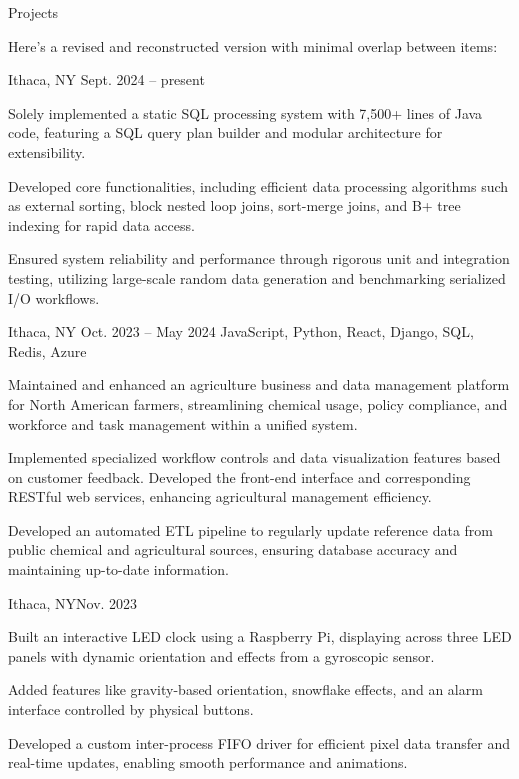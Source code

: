 \documentclass[10pt]{article}
\begin{document}
\begin{customsection}{Projects}

    Here’s a revised and reconstructed version with minimal overlap between items:

    {Ithaca, NY}
    {Sept. 2024 -- present} 
    {} 
    { 
        \item Solely implemented a static SQL processing system with 7,500+ lines of Java code, featuring a SQL query plan builder and modular architecture for extensibility.
        \item Developed core functionalities, including efficient data processing algorithms such as external sorting, block nested loop joins, sort-merge joins, and B+ tree indexing for rapid data access.
        \item Ensured system reliability and performance through rigorous unit and integration testing, utilizing large-scale random data generation and benchmarking serialized I/O workflows.
    }

    {Ithaca, NY}
    {Oct. 2023 -- May 2024}
    {JavaScript, Python, React, Django, SQL, Redis, Azure}
    {
        \item Maintained and enhanced an agriculture business and data management platform for North American farmers, streamlining chemical usage, policy compliance, and workforce and task management within a unified system.
        \item Implemented specialized workflow controls and data visualization features based on customer feedback. Developed the front-end interface and corresponding RESTful web services, enhancing agricultural management efficiency.
        \item Developed an automated ETL pipeline to regularly update reference data from public chemical and agricultural sources, ensuring database accuracy and maintaining up-to-date information.
    }

    {Ithaca, NY}{Nov. 2023}
    {}
    {
        \item Built an interactive LED clock using a Raspberry Pi, displaying across three LED panels with dynamic orientation and effects from a gyroscopic sensor. 
        \item Added features like gravity-based orientation, snowflake effects, and an alarm interface controlled by physical buttons. 
        \item Developed a custom inter-process FIFO driver for efficient pixel data transfer and real-time updates, enabling smooth performance and animations. 
    }


\end{customsection}
\end{document}
